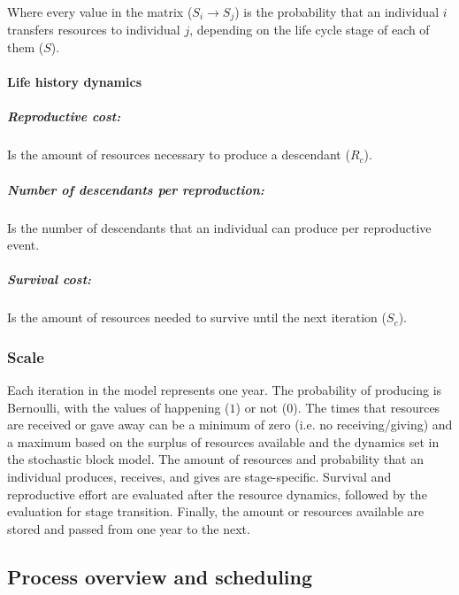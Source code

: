 \documentclass{article}
\begin{document}
Where every value in the matrix ($S_i \to S_j$) is the probability that an individual $i$ transfers resources to individual $j$, depending on the life cycle stage of each of them ($S$).
    
\paragraph{Life history dynamics}

\subparagraph{Reproductive cost:}

Is the amount of resources necessary to produce a descendant ($R_c$).

\subparagraph{Number of descendants per reproduction:}

Is the number of descendants that an individual can produce per reproductive event.

\subparagraph{Survival cost:}

Is the amount of resources needed to survive until the next iteration ($S_c$).

\subsubsection{Scale}

Each iteration in the model represents one year. The probability  of producing is Bernoulli, with the values of happening ($1$) or not ($0$). The times that resources are received or gave away can be a minimum of zero (i.e. no receiving/giving) and a maximum based on the surplus of resources available and the dynamics set in the stochastic block model. The amount of resources and probability that an individual produces, receives, and gives are stage-specific. Survival and reproductive effort are evaluated after the resource dynamics, followed by the evaluation for stage transition. Finally, the amount or resources available are stored and passed from one year to the next.

\subsection{Process overview and scheduling}
\end{document}
